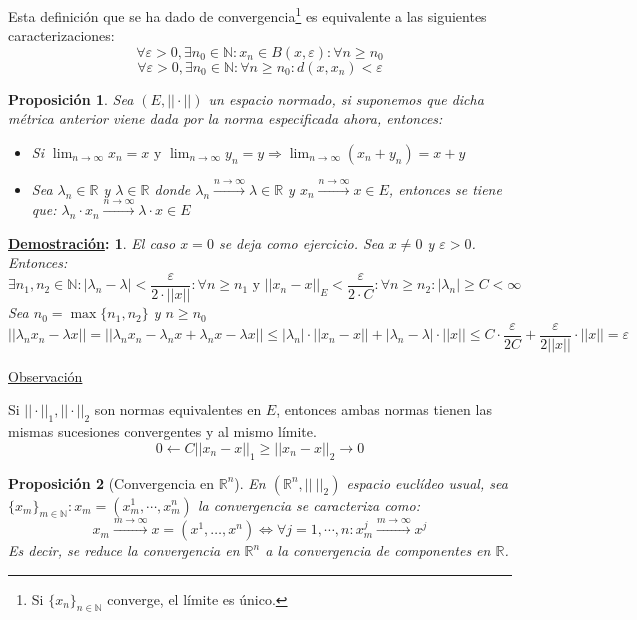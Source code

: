 \documentclass[10pt,a4paper,openright]{book}
\theoremstyle{break}
\newtheorem*{prop}{Proposición}
\newtheorem*{demo}{\underline{Demostración}:}
\begin{document}
Esta definición que se ha dado de convergencia\footnote{Si $\{x_n\}_{n \in \mathbb{N}}$ converge, el límite es único.} es equivalente a las siguientes caracterizaciones:
$$\forall \varepsilon > 0, \exists n_0 \in \mathbb{N} : x_n \in B(x, \varepsilon) : \forall n \geq n_0$$
$$\forall \varepsilon > 0, \exists n_0 \in \mathbb{N} : \forall n \geq n_0 : d(x,x_n) < \varepsilon$$

\begin{prop}
Sea $(E, || \cdot ||)$ un espacio normado, si suponemos que dicha métrica anterior viene dada por la norma especificada ahora, entonces:
\begin{itemize}
\item Si $\lim_{n \to \infty} x_n = x \mbox{ y } \lim_{n \to \infty} y_n = y \Rightarrow \lim_{n \to \infty} (x_n + y_n) = x + y$
\item Sea $\lambda_n \in \mathbb{R}$ y $\lambda \in \mathbb{R}$ donde $ \lambda_n \xrightarrow{n\rightarrow\infty}\lambda \in \mathbb{R}$ y $x_n \xrightarrow{n\rightarrow\infty} x \in E$, entonces se tiene que: $\lambda_n \cdot x_n \xrightarrow{n\rightarrow\infty} \lambda \cdot x \in E$
\end{itemize}
\end{prop}

\begin{demo}
El caso $x = 0$ se deja como ejercicio. Sea $x \neq 0$ y $\varepsilon > 0$. Entonces:
$$\exists n_1, n_2 \in \mathbb{N} : | \lambda_n - \lambda | < \frac{\varepsilon}{2 \cdot ||x||} : \forall n \geq n_1 \mbox{ y } ||x_n - x||_E < \frac{\varepsilon}{2 \cdot C} : \forall n \geq n_2 : |\lambda_n| \geq C < \infty$$
Sea $n_0 = \max\{n_1, n_2\}$ y $n \geq n_0$
$$||\lambda_n x_n - \lambda x || = ||\lambda_n x_n - \lambda_n x + \lambda_n x - \lambda x || \leq |\lambda_n| \cdot ||x_n - x|| + |\lambda_n - \lambda | \cdot ||x|| \leq C \cdot \frac{\varepsilon}{2C} + \frac{\varepsilon}{2||x||}\cdot ||x|| = \varepsilon$$
\end{demo}

\underline{Observación}

Si $||\cdot||_1, ||\cdot||_2$ son normas equivalentes en $E$, entonces ambas normas tienen las mismas sucesiones convergentes y al mismo límite.
$$0 \leftarrow C||x_n - x||_1 \geq ||x_n - x||_2 \to 0$$

\begin{prop}[Convergencia en $\mathbb{R}^n$]
En $(\mathbb{R}^n, || \ ||_2)$ espacio euclídeo usual, sea $\{x_m\}_{m \in  \mathbb{N}}: x_m = (x_m^1, \cdots, x_m^n)$ la convergencia se caracteriza como:
$$x_m \xrightarrow{m \rightarrow \infty} x = (x^1, \ldots, x^n) \Leftrightarrow \forall j = 1, \cdots, n: x_m^j \xrightarrow{m\rightarrow\infty} x^j$$
Es decir, se reduce la convergencia en $\mathbb{R}^n$ a la convergencia de componentes en $\mathbb{R}$.
\end{prop}
\end{document}

